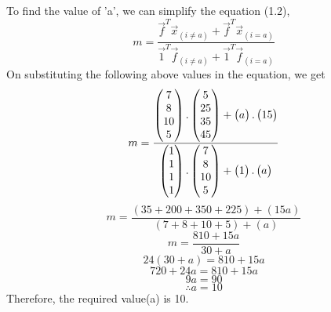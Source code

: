\documentclass[journal,12pt,twocolumn]{IEEEtran}
\begin{document}
To find the value of 'a', we can simplify the equation (1.2),
\begin{equation}\label{eqn}
		m = \frac{\vec{f}^T\vec{x}_{(i\neq a)} + \vec{f}^T\vec{x}_{(i=a)}}{\vec{1}^T\vec{f}_{(i\neq a)} + \vec{1}^T\vec{f}_{(i=a)}}
\end{equation}
On substituting the following above values in the equation, we get
\begin{equation*}
	m = \frac{\begin{pmatrix}7\\8\\10\\5\end{pmatrix}.\begin{pmatrix}5\\25\\35\\45\end{pmatrix} + \begin{pmatrix}a\end{pmatrix}.\begin{pmatrix}15\end{pmatrix}}{\begin{pmatrix}1\\1\\1\\1\end{pmatrix}.\begin{pmatrix}7\\8\\10\\5\end{pmatrix} + \begin{pmatrix}1\end{pmatrix}.\begin{pmatrix}a\end{pmatrix}}
\end{equation*}
\begin{equation*}
	m = \frac{(35 + 200 + 350 + 225) + (15a)}{(7 + 8 + 10 + 5) + (a)}
\end{equation*}
\begin{equation*}
	m = \frac{810 + 15a}{30 + a}
\end{equation*}
	\begin{equation*}
		24(30 + a) = 810 + 15a
	\end{equation*}
	\begin{equation*}
		720 + 24a = 810 + 15a
	\end{equation*}
	\begin{equation*}
		9a = 90
	\end{equation*}
	\begin{equation*}
		\therefore a = 10
	\end{equation*}
	Therefore, the required value(a) is 10.
\end{document}
